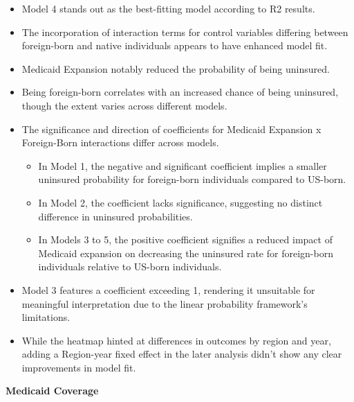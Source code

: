 \documentclass[
]{article}
\providecommand{\tightlist}{%
  \setlength{\itemsep}{0pt}\setlength{\parskip}{0pt}}
\begin{document}
\begin{itemize}
\tightlist
\item
  Model 4 stands out as the best-fitting model according to R2 results.
\item
  The incorporation of interaction terms for control variables differing
  between foreign-born and native individuals appears to have enhanced
  model fit.
\item
  Medicaid Expansion notably reduced the probability of being uninsured.
\item
  Being foreign-born correlates with an increased chance of being
  uninsured, though the extent varies across different models.
\item
  The significance and direction of coefficients for Medicaid Expansion
  x Foreign-Born interactions differ across models.

  \begin{itemize}
  \tightlist
  \item
    In Model 1, the negative and significant coefficient implies a
    smaller uninsured probability for foreign-born individuals compared
    to US-born.
  \item
    In Model 2, the coefficient lacks significance, suggesting no
    distinct difference in uninsured probabilities.
  \item
    In Models 3 to 5, the positive coefficient signifies a reduced
    impact of Medicaid expansion on decreasing the uninsured rate for
    foreign-born individuals relative to US-born individuals.
  \end{itemize}
\item
  Model 3 features a coefficient exceeding 1, rendering it unsuitable
  for meaningful interpretation due to the linear probability
  framework's limitations.
\item
  While the heatmap hinted at differences in outcomes by region and
  year, adding a Region-year fixed effect in the later analysis didn't
  show any clear improvements in model fit.
\end{itemize}

\textbf{Medicaid Coverage}
\end{document}
